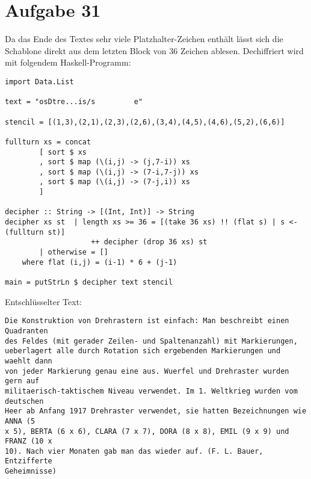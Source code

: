 \section*{Aufgabe 31}
Da das Ende des Textes sehr viele Platzhalter-Zeichen enthält lässt sich die
Schablone direkt aus dem letzten Block von $36$ Zeichen ablesen. Dechiffriert
wird mit folgendem Haskell-Programm:
\lstset{language=Haskell}
\begin{lstlisting}
import Data.List

text = "osDtre...is/s         e"

stencil = [(1,3),(2,1),(2,3),(2,6),(3,4),(4,5),(4,6),(5,2),(6,6)]

fullturn xs = concat
		[ sort $ xs
		, sort $ map (\(i,j) -> (j,7-i)) xs
		, sort $ map (\(i,j) -> (7-i,7-j)) xs
		, sort $ map (\(i,j) -> (7-j,i)) xs
		]

decipher :: String -> [(Int, Int)] -> String
decipher xs st	| length xs >= 36 = [(take 36 xs) !! (flat s) | s <- (fullturn st)] 
					++ decipher (drop 36 xs) st
		| otherwise = []
	where flat (i,j) = (i-1) * 6 + (j-1)

main = putStrLn $ decipher text stencil
\end{lstlisting}
Entschlüsselter Text:
\begin{verbatim}
Die Konstruktion von Drehrastern ist einfach: Man beschreibt einen Quadranten
des Feldes (mit gerader Zeilen- und Spaltenanzahl) mit Markierungen,
ueberlagert alle durch Rotation sich ergebenden Markierungen und waehlt dann
von jeder Markierung genau eine aus. Wuerfel und Drehraster wurden gern auf
militaerisch-taktischem Niveau verwendet. Im 1. Weltkrieg wurden vom deutschen
Heer ab Anfang 1917 Drehraster verwendet, sie hatten Bezeichnungen wie ANNA (5
x 5), BERTA (6 x 6), CLARA (7 x 7), DORA (8 x 8), EMIL (9 x 9) und FRANZ (10 x
10). Nach vier Monaten gab man das wieder auf. (F. L. Bauer, Entzifferte
Geheimnisse)
\end{verbatim}
